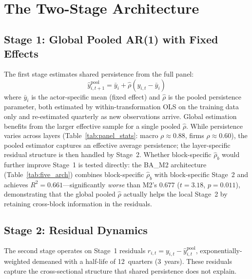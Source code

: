 \documentclass[11pt,a4paper]{article}
\begin{document}
\section{The Two-Stage Architecture}
\label{sec:architecture}

\subsection{Stage 1: Global Pooled AR(1) with Fixed Effects}

The first stage estimates shared persistence from the full panel:
\begin{equation}
\hat{y}^{\mathrm{pool}}_{i,t+1} = \bar{y}_i + \hat{\rho} \left( y_{i,t} - \bar{y}_i \right)
\end{equation}
where $\bar{y}_i$ is the actor-specific mean (fixed effect) and $\hat{\rho}$ is the pooled persistence parameter, both estimated by within-transformation OLS on the training data only and re-estimated quarterly as new observations arrive. Global estimation benefits from the larger effective sample for a single pooled $\hat\rho$. While persistence varies across layers (Table~\ref{tab:panel_stats}: macro $\rho \approx 0.88$, firms $\rho \approx 0.60$), the pooled estimator captures an effective average persistence; the layer-specific residual structure is then handled by Stage~2. Whether block-specific $\hat\rho_b$ would further improve Stage~1 is tested directly: the BA\_M2 architecture (Table~\ref{tab:five_arch}) combines block-specific $\hat\rho_b$ with block-specific Stage~2 and achieves $R^2 = 0.661$---significantly \emph{worse} than M2's $0.677$ ($t = 3.18$, $p = 0.011$), demonstrating that the global pooled $\hat\rho$ actually helps the local Stage~2 by retaining cross-block information in the residuals.

\subsection{Stage 2: Residual Dynamics}

The second stage operates on Stage~1 residuals $r_{i,t} = y_{i,t} - \hat{y}^{\mathrm{pool}}_{i,t}$, exponentially-weighted demeaned with a half-life of 12~quarters (3~years). These residuals capture the cross-sectional structure that shared persistence does not explain.
\end{document}
